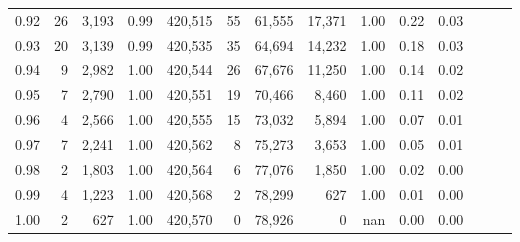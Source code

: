 \begin{tabular}{rrrrrrrrrrrrrr}
0.92 &     26 &  3,193 &  0.99 &  420,515 &       55 &  61,555 &  17,371 &  1.00 &  0.22 &      0.03 \\
0.93 &     20 &  3,139 &  0.99 &  420,535 &       35 &  64,694 &  14,232 &  1.00 &  0.18 &      0.03 \\
0.94 &      9 &  2,982 &  1.00 &  420,544 &       26 &  67,676 &  11,250 &  1.00 &  0.14 &      0.02 \\
0.95 &      7 &  2,790 &  1.00 &  420,551 &       19 &  70,466 &   8,460 &  1.00 &  0.11 &      0.02 \\
0.96 &      4 &  2,566 &  1.00 &  420,555 &       15 &  73,032 &   5,894 &  1.00 &  0.07 &      0.01 \\
0.97 &      7 &  2,241 &  1.00 &  420,562 &        8 &  75,273 &   3,653 &  1.00 &  0.05 &      0.01 \\
0.98 &      2 &  1,803 &  1.00 &  420,564 &        6 &  77,076 &   1,850 &  1.00 &  0.02 &      0.00 \\
0.99 &      4 &  1,223 &  1.00 &  420,568 &        2 &  78,299 &     627 &  1.00 &  0.01 &      0.00 \\
1.00 &      2 &    627 &  1.00 &  420,570 &        0 &  78,926 &       0 &   nan &  0.00 &      0.00 \\
\bottomrule
\end{tabular}
